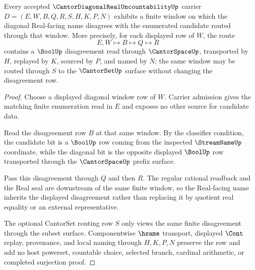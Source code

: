 \begin{theorem}
\label{thm:cantor-diagonal-real-uncountability-diagonal-separation}
Every accepted $\CantorDiagonalRealUncountabilityUp$ carrier $D=(E,W,B,Q,R,S,H,K,P,N)$ exhibits a finite window on which the diagonal Real-facing name disagrees with the enumerated candidate routed through that window. More precisely, for each displayed row of $W$, the route
$$
E,W \longmapsto B \longmapsto Q \longmapsto R
$$
contains a $\BoolUp$ disagreement read through $\CantorSpaceUp$, transported by $H$, replayed by $K$, sourced by $P$, and named by $N$; the same window may be routed through $S$ to the $\CantorSetUp$ surface without changing the disagreement row.
\end{theorem}
\begin{proof}
Choose a displayed diagonal window row of $W$. Carrier admission gives the matching finite enumeration read in $E$ and exposes no other source for candidate data.

Read the disagreement row $B$ at that same window. By the classifier condition, the candidate bit is a $\BoolUp$ row coming from the inspected $\StreamNameUp$ coordinate, while the diagonal bit is the opposite displayed $\BoolUp$ row transported through the $\CantorSpaceUp$ prefix surface.

Pass this disagreement through $Q$ and then $R$. The regular rational readback and the Real seal are downstream of the same finite window, so the Real-facing name inherits the displayed disagreement rather than replacing it by quotient real equality or an external representative.

The optional CantorSet routing row $S$ only views the same finite disagreement through the subset surface. Componentwise $\hsame$ transport, displayed $\Cont$ replay, provenance, and local naming through $H,K,P,N$ preserve the row and add no host powerset, countable choice, selected branch, cardinal arithmetic, or completed surjection proof.
\end{proof}


